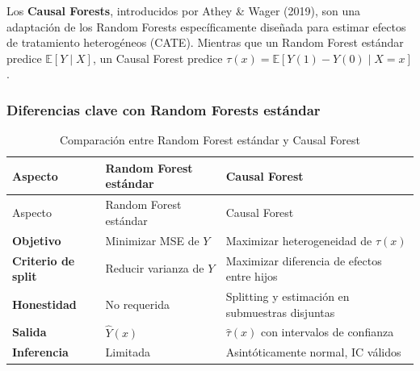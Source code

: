 \documentclass[
  spanish,
  11pt,
  letterpaper,
]{scrbook}
\theoremstyle{plain}
\theoremstyle{remark}
\begin{document}
Los \textbf{Causal Forests}, introducidos por Athey \& Wager (2019), son
una adaptación de los Random Forests específicamente diseñada para
estimar efectos de tratamiento heterogéneos (CATE). Mientras que un
Random Forest estándar predice \(\mathbb{E}[Y \mid X]\), un Causal
Forest predice \(\tau(x) = \mathbb{E}[Y(1) - Y(0) \mid X = x]\).

\subsubsection{Diferencias clave con Random Forests
estándar}\label{diferencias-clave-con-random-forests-estuxe1ndar}

\begin{longtable}[]{@{}
  >{\raggedright\arraybackslash}p{}
  >{\raggedright\arraybackslash}p{}
  >{\raggedright\arraybackslash}p{}@{}}
\caption{Comparación entre Random Forest estándar y Causal
Forest}\label{tbl-rf-vs-cf}\tabularnewline
\toprule\noalign{}
\begin{minipage}[b]{\linewidth}\raggedright
Aspecto
\end{minipage} & \begin{minipage}[b]{\linewidth}\raggedright
Random Forest estándar
\end{minipage} & \begin{minipage}[b]{\linewidth}\raggedright
Causal Forest
\end{minipage} \\
\midrule\noalign{}
\endfirsthead
\toprule\noalign{}
\begin{minipage}[b]{\linewidth}\raggedright
Aspecto
\end{minipage} & \begin{minipage}[b]{\linewidth}\raggedright
Random Forest estándar
\end{minipage} & \begin{minipage}[b]{\linewidth}\raggedright
Causal Forest
\end{minipage} \\
\midrule\noalign{}
\endhead
\bottomrule\noalign{}
\endlastfoot
\textbf{Objetivo} & Minimizar MSE de \(Y\) & Maximizar heterogeneidad de
\(\tau(x)\) \\
\textbf{Criterio de split} & Reducir varianza de \(Y\) & Maximizar
diferencia de efectos entre hijos \\
\textbf{Honestidad} & No requerida & Splitting y estimación en
submuestras disjuntas \\
\textbf{Salida} & \(\hat{Y}(x)\) & \(\hat{\tau}(x)\) con intervalos de
confianza \\
\textbf{Inferencia} & Limitada & Asintóticamente normal, IC válidos \\
\end{longtable}
\end{document}
